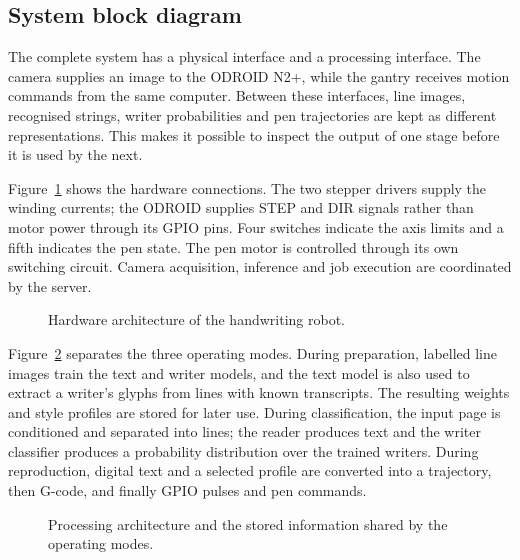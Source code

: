 \subsection{System block diagram}
\label{sec:des-system}
The complete system has a physical interface and a processing interface. The camera supplies an image to the ODROID N2+, while the gantry receives motion commands from the same computer. Between these interfaces, line images, recognised strings, writer probabilities and pen trajectories are kept as different representations. This makes it possible to inspect the output of one stage before it is used by the next.

Figure~\ref{fig:des-hardware-system} shows the hardware connections. The two stepper drivers supply the winding currents; the ODROID supplies STEP and DIR signals rather than motor power through its GPIO pins. Four switches indicate the axis limits and a fifth indicates the pen state. The pen motor is controlled through its own switching circuit. Camera acquisition, inference and job execution are coordinated by the server.
\begin{figure}[!htbp]\centering
{}
\caption{Hardware architecture of the handwriting robot.}
\label{fig:des-hardware-system}
\end{figure}

Figure~\ref{fig:des-processing-system} separates the three operating modes. During preparation, labelled line images train the text and writer models, and the text model is also used to extract a writer's glyphs from lines with known transcripts. The resulting weights and style profiles are stored for later use. During classification, the input page is conditioned and separated into lines; the reader produces text and the writer classifier produces a probability distribution over the trained writers. During reproduction, digital text and a selected profile are converted into a trajectory, then G-code, and finally GPIO pulses and pen commands.
\begin{figure}[!htbp]\centering
{}
\caption{Processing architecture and the stored information shared by the operating modes.}
\label{fig:des-processing-system}
\end{figure}

